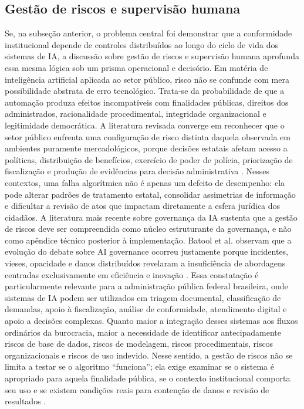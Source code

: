 \documentclass[12pt,a4paper]{article}
\begin{document}
\subsection{Gestão de riscos e supervisão humana}
\label{sec:org9c761f9}
Se, na subseção anterior, o problema central foi demonstrar que a conformidade institucional depende de controles distribuídos ao longo do ciclo de vida dos sistemas de IA, a discussão sobre gestão de riscos e supervisão humana aprofunda essa mesma lógica sob um prisma operacional e decisório. Em matéria de inteligência artificial aplicada ao setor público, risco não se confunde com mera possibilidade abstrata de erro tecnológico. Trata-se da probabilidade de que a automação produza efeitos incompatíveis com finalidades públicas, direitos dos administrados, racionalidade procedimental, integridade organizacional e legitimidade democrática. A literatura revisada converge em reconhecer que o setor público enfrenta uma configuração de risco distinta daquela observada em ambientes puramente mercadológicos, porque decisões estatais afetam acesso a políticas, distribuição de benefícios, exercício de poder de polícia, priorização de fiscalização e produção de evidências para decisão administrativa \autocite{madan2022ai} \autocite{criado2024artificial} \autocite{pi2021machine}. Nesses contextos, uma falha algorítmica não é apenas um defeito de desempenho: ela pode alterar padrões de tratamento estatal, consolidar assimetrias de informação e dificultar a revisão de atos que impactam diretamente a esfera jurídica dos cidadãos.
A literatura mais recente sobre governança da IA sustenta que a gestão de riscos deve ser compreendida como núcleo estruturante da governança, e não como apêndice técnico posterior à implementação. Batool et al. observam que a evolução do debate sobre AI governance ocorreu justamente porque incidentes, vieses, opacidade e danos distribuídos revelaram a insuficiência de abordagens centradas exclusivamente em eficiência e inovação \autocite{batool2025ai}. Essa constatação é particularmente relevante para a administração pública federal brasileira, onde sistemas de IA podem ser utilizados em triagem documental, classificação de demandas, apoio à fiscalização, análise de conformidade, atendimento digital e apoio a decisões complexas. Quanto maior a integração desses sistemas aos fluxos ordinários da burocracia, maior a necessidade de identificar antecipadamente riscos de base de dados, riscos de modelagem, riscos procedimentais, riscos organizacionais e riscos de uso indevido. Nesse sentido, a gestão de riscos não se limita a testar se o algoritmo “funciona”; ela exige examinar se o sistema é apropriado para aquela finalidade pública, se o contexto institucional comporta seu uso e se existem condições reais para contenção de danos e revisão de resultados \autocite{parycek2023artificial} \autocite{serra2024a}.
\end{document}
